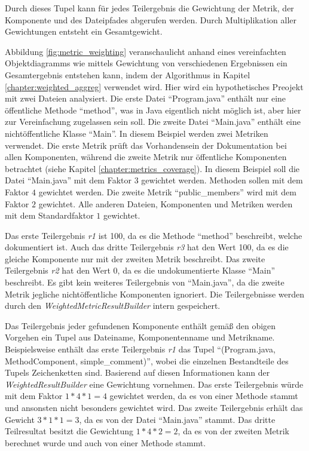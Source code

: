 
Durch dieses Tupel kann für jedes Teilergebnis die Gewichtung der Metrik, der Komponente und des Dateipfades  abgerufen werden. Durch Multiplikation  aller Gewichtungen entsteht ein Gesamtgewicht.

Abbildung \ref{fig:metric_weighting} veranschaulicht anhand eines vereinfachten Objektdiagramms wie mittels Gewichtung von verschiedenen Ergebnissen ein Gesamtergebnis entstehen kann, indem der Algorithmus in Kapitel \ref{chapter:weighted_aggreg} verwendet wird. Hier wird ein hypothetisches Preojekt mit zwei Dateien analysiert. Die erste Datei \enquote{Program.java} enthält nur eine öffentliche Methode \enquote{method}, was in Java eigentlich nicht möglich ist, aber hier zur Vereinfachung zugelassen sein soll. Die zweite Datei \enquote{Main.java} enthält eine nichtöffentliche Klasse \enquote{Main}. In diesem Beispiel werden zwei Metriken verwendet. Die erste Metrik prüft das Vorhandensein der Dokumentation bei allen Komponenten, während die zweite Metrik nur öffentliche Komponenten betrachtet (siehe Kapitel \ref{chapter:metrics_coverage}). In diesem Beispiel soll die Datei \enquote{Main.java} mit dem Faktor $3$ gewichtet werden. Methoden sollen mit dem Faktor $4$ gewichtet werden. Die zweite Metrik \enquote{public\_members} wird mit dem Faktor $2$ gewichtet. Alle anderen Dateien, Komponenten und Metriken werden mit dem Standardfaktor $1$ gewichtet.

Das erste Teilergebnis \textit{r1} ist 100, da es die  Methode \enquote{method} beschreibt, welche dokumentiert ist. Auch das dritte Teilergebnis \textit{r3} hat den Wert 100, da es die gleiche Komponente nur mit der zweiten Metrik beschreibt. Das zweite Teilergebnis \textit{r2} hat den Wert 0, da es die undokumentierte Klasse \enquote{Main} beschreibt.  Es gibt kein weiteres Teilergebnis von \enquote{Main.java}, da die zweite Metrik jegliche nichtöffentliche Komponenten ignoriert. Die Teilergebnisse werden durch den \textit{WeightedMetricResultBuilder} intern gespeichert. 

Das Teilergebnis jeder gefundenen Komponente enthält gemäß den obigen Vorgehen ein Tupel aus Dateiname, Komponentenname und Metrikname. Beispielsweise enthält das erste  Teilergebnis \textit{r1} das Tupel \enquote{(Program.java, MethodComponent, simple\_comment)}, wobei die einzelnen Bestandteile des Tupels Zeichenketten sind. Basierend auf diesen Informationen kann der \textit{WeightedResultBuilder} eine Gewichtung vornehmen. Das erste Teilergebnis würde mit dem Faktor $1*4*1=4$ gewichtet werden, da es von einer Methode stammt  und ansonsten nicht besonders gewichtet wird. Das zweite Teilergebnis erhält das Gewicht $3*1*1=3$, da es von der Datei \enquote{Main.java} stammt. Das dritte Teilresultat besitzt die Gewichtung $1*4*2=2$, da es von der zweiten Metrik berechnet wurde und auch von einer Methode stammt. 

